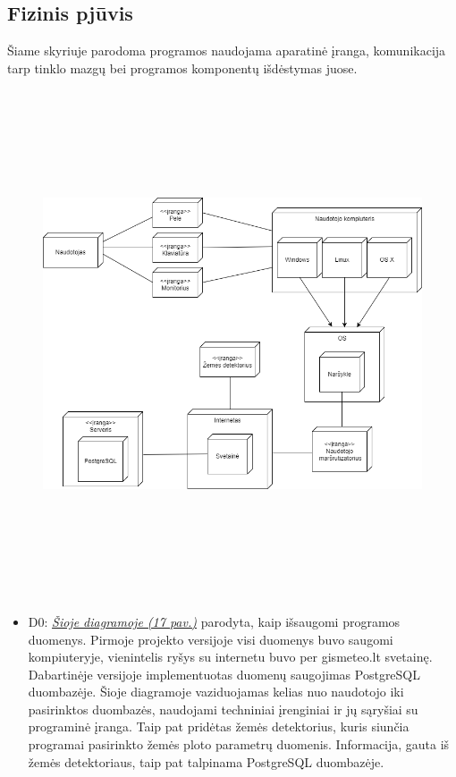 \documentclass[oneside]{VUMIFPSkursinis}
\begin{document}
\subsection{Fizinis pjūvis}
	Šiame skyriuje parodoma programos naudojama aparatinė įranga, komunikacija tarp tinklo mazgų bei programos komponentų išdėstymas juose.
	\newline
	\vskip 0.5cm
	\begin{figure}[H]
	\centering	
	\includegraphics[width=15cm,height=15cm,keepaspectratio]{2D0.png}
	\caption{}
	\label{fig:Deployment}
\end{figure}
	\begin{itemize}
		\item D0: \hyperref[fig:Deployment]{\textit{Šioje diagramoje (17 pav.)}} parodyta, kaip išsaugomi programos duomenys. 
		Pirmoje projekto versijoje visi duomenys buvo saugomi kompiuteryje, vienintelis ryšys su internetu buvo per gismeteo.lt svetainę. Dabartinėje versijoje implementuotas duomenų saugojimas PostgreSQL duombazėje. Šioje diagramoje vaziduojamas kelias nuo naudotojo iki pasirinktos duombazės, naudojami techniniai įrenginiai ir jų sąryšiai su programinė įranga. Taip pat pridėtas žemės detektorius, kuris siunčia programai pasirinkto žemės ploto parametrų duomenis. Informacija, gauta iš žemės detektoriaus, taip pat talpinama PostgreSQL duombazėje.
	\end{itemize}



\end{document}
